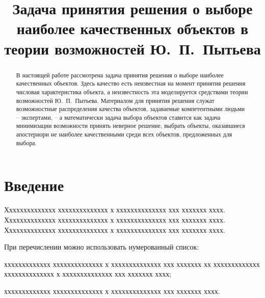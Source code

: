 \documentclass[12pt]{a&t}
\begin{document}

\title{Задача принятия решения о выборе наиболее качественных объектов в теории возможностей Ю.~П.~Пытьева}%


\maketitle

\begin{abstract}
В настоящей работе рассмотрена задача принятия решения о выборе наиболее качественных объектов. Здесь качество  есть  неизвестная на момент принятия решения числовая характеристика объекта, а неизвестность эта моделируется средствами теории возможностей Ю.~П.~Пытьева.  Материалом для принятия решения служат возможностные распределения качества объектов, задаваемые компетентными людьми -- экспертами, -- а математически задача выбора объектов ставится как задача минимизации возможности принять неверное решение, \te выбрать объекты, оказавшиеся апостериори не наиболее качественными среди всех объектов, предложенных для выбора.
\end{abstract}


\section{Введение}

Хххххххххххххх хххххххххххххх х хххххххххххххх ххх ххххххх хххх.
Хххххххххххххх хххххххххххххх х хххххххххххххх ххх ххххххх хххх.
Хххххххххххххх хххххххххххххх х хххххххххххххх ххх ххххххх хххх.

При перечислении можно использовать нумерованный список:
\begin{enumlist} %
\item
ххххххххххххх хххххххххххххх х хххххххххххххх ххх ххххххх хх
ххххххххххххх хххххххххххххх х хххххххххххххх ххх ххххххх хххх;

\item
ххххххххххххх хххххххххххххх х хххххххххххххх ххх ххххххх хххх.
\end{enumlist}
\end{document}
